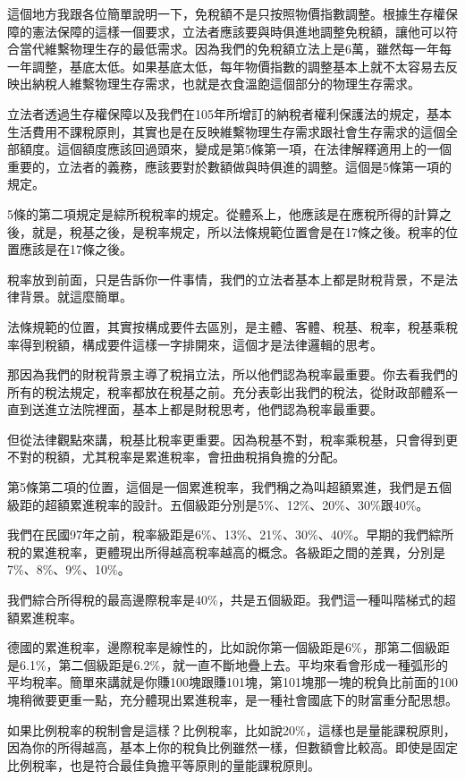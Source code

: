 \documentclass[]{ctexbook}
\begin{document}
這個地方我跟各位簡單說明一下，免稅額不是只按照物價指數調整。根據生存權保障的憲法保障的這樣一個要求，立法者應該要與時俱進地調整免稅額，讓他可以符合當代維繫物理生存的最低需求。因為我們的免稅額立法上是6萬，雖然每一年每一年調整，基底太低。如果基底太低，每年物價指數的調整基本上就不太容易去反映出納稅人維繫物理生存需求，也就是衣食溫飽這個部分的物理生存需求。

立法者透過生存權保障以及我們在105年所增訂的納稅者權利保護法的規定，基本生活費用不課稅原則，其實也是在反映維繫物理生存需求跟社會生存需求的這個全部額度。這個額度應該回過頭來，變成是第5條第一項，在法律解釋適用上的一個重要的，立法者的義務，應該要對於數額做與時俱進的調整。這個是5條第一項的規定。

5條的第二項規定是綜所稅稅率的規定。從體系上，他應該是在應稅所得的計算之後，就是，稅基之後，是稅率規定，所以法條規範位置會是在17條之後。稅率的位置應該是在17條之後。

稅率放到前面，只是告訴你一件事情，我們的立法者基本上都是財稅背景，不是法律背景。就這麼簡單。

法條規範的位置，其實按構成要件去區別，是主體、客體、稅基、稅率，稅基乘稅率得到稅額，構成要件這樣一字排開來，這個才是法律邏輯的思考。

那因為我們的財稅背景主導了稅捐立法，所以他們認為稅率最重要。你去看我們的所有的稅法規定，稅率都放在稅基之前。充分表彰出我們的稅法，從財政部體系一直到送進立法院裡面，基本上都是財稅思考，他們認為稅率最重要。

但從法律觀點來講，稅基比稅率更重要。因為稅基不對，稅率乘稅基，只會得到更不對的稅額，尤其稅率是累進稅率，會扭曲稅捐負擔的分配。

第5條第二項的位置，這個是一個累進稅率，我們稱之為叫超額累進，我們是五個級距的超額累進稅率的設計。五個級距分別是5\%、12\%、20\%、30\%跟40\%。

我們在民國97年之前，稅率級距是6\%、13\%、21\%、30\%、40\%。早期的我們綜所稅的累進稅率，更體現出所得越高稅率越高的概念。各級距之間的差異，分別是7\%、8\%、9\%、10\%。

我們綜合所得稅的最高邊際稅率是40\%，共是五個級距。我們這一種叫階梯式的超額累進稅率。

德國的累進稅率，邊際稅率是線性的，比如說你第一個級距是6\%，那第二個級距是6.1\%，第二個級距是6.2\%，就一直不斷地疊上去。平均來看會形成一種弧形的平均稅率。簡單來講就是你賺100塊跟賺101塊，第101塊那一塊的稅負比前面的100塊稍微要更重一點，充分體現出累進稅率，是一種社會國底下的財富重分配思想。

如果比例稅率的稅制會是這樣？比例稅率，比如說20\%，這樣也是量能課稅原則，因為你的所得越高，基本上你的稅負比例雖然一樣，但數額會比較高。即使是固定比例稅率，也是符合最佳負擔平等原則的量能課稅原則。
\end{document}
